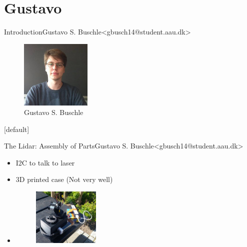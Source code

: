 \section{Gustavo}

\begin{frame}{Introduction}{Gustavo S. Buschle\newline<gbusch14@student.aau.dk>}
    \begin{figure}[h!]
        \includegraphics[width=0.3\textwidth]{images/gustavo.jpg}
        \caption{Gustavo S. Buschle}
        \centering
    \end{figure}
\end{frame}
[default]

\begin{frame}{The Lidar: Assembly of Parts}{Gustavo S. Buschle\newline<gbusch14@student.aau.dk>}
    \begin{itemize}
        \item <1-> I2C to talk to laser
        \item <2-> 3D printed case (Not very well)
        \item <1-> \begin{figure}
            \includegraphics[width=0.3\textwidth]{images/lidarpi.jpg}
        \end{figure}
    \end{itemize}
\end{frame}

